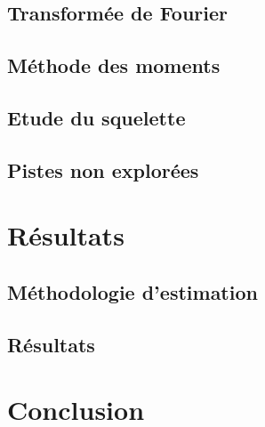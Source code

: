 \documentclass{article}
\begin{document}
    \subsection{Transformée de Fourier}  %
    
    \subsection{Méthode des moments} %
    
    \subsection{Etude du squelette} %
    
    \subsection{Pistes non explorées}
  
  \section{Résultats} 
  
    \subsection{Méthodologie d'estimation}  %
    
    \subsection{Résultats} %
  
  \section{Conclusion}
  
\end{document}
